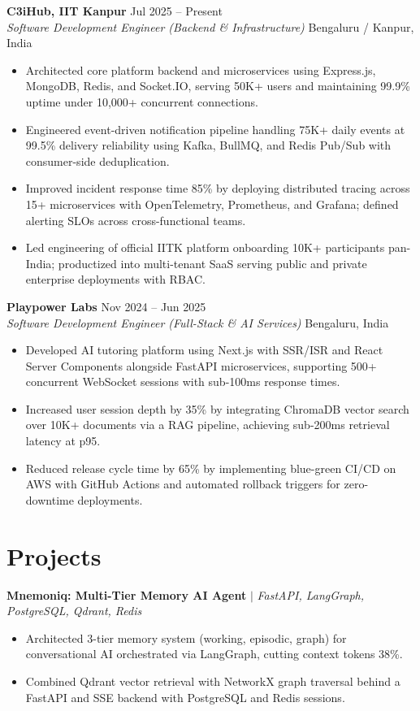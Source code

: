 \documentclass[10pt]{article}
\newcommand{\rItemList}{\begin{itemize}[leftmargin=1.1em, itemsep=0.8pt, topsep=0.8pt, parsep=0pt, label=\textbullet]}
\newcommand{\rEndItemList}{\end{itemize}}
\begin{document}
\textbf{C3iHub, IIT Kanpur} \hfill Jul 2025 -- Present \\
\textit{Software Development Engineer (Backend \& Infrastructure)} \hfill Bengaluru / Kanpur, India
\rItemList
\item Architected core platform backend and microservices using Express.js, MongoDB, Redis, and Socket.IO, serving 50K+ users and maintaining 99.9\% uptime under 10,000+ concurrent connections.
\item Engineered event-driven notification pipeline handling 75K+ daily events at 99.5\% delivery reliability using Kafka, BullMQ, and Redis Pub/Sub with consumer-side deduplication.
\item Improved incident response time 85\% by deploying distributed tracing across 15+ microservices with OpenTelemetry, Prometheus, and Grafana; defined alerting SLOs across cross-functional teams.
\item Led engineering of official IITK platform onboarding 10K+ participants pan-India; productized into multi-tenant SaaS serving public and private enterprise deployments with RBAC.
\rEndItemList

\textbf{Playpower Labs} \hfill Nov 2024 -- Jun 2025 \\
\textit{Software Development Engineer (Full-Stack \& AI Services)} \hfill Bengaluru, India
\rItemList
\item Developed AI tutoring platform using Next.js with SSR/ISR and React Server Components alongside FastAPI microservices, supporting 500+ concurrent WebSocket sessions with sub-100ms response times.
\item Increased user session depth by 35\% by integrating ChromaDB vector search over 10K+ documents via a RAG pipeline, achieving sub-200ms retrieval latency at p95.
\item Reduced release cycle time by 65\% by implementing blue-green CI/CD on AWS with GitHub Actions and automated rollback triggers for zero-downtime deployments.
\rEndItemList

\section{Projects}

\textbf{Mnemoniq: Multi-Tier Memory AI Agent} $\vert$ \textit{FastAPI, LangGraph, PostgreSQL, Qdrant, Redis} \\
\rItemList
\item Architected 3-tier memory system (working, episodic, graph) for conversational AI orchestrated via LangGraph, cutting context tokens 38\%.
\item Combined Qdrant vector retrieval with NetworkX graph traversal behind a FastAPI and SSE backend with PostgreSQL and Redis sessions.
\rEndItemList
\end{document}
